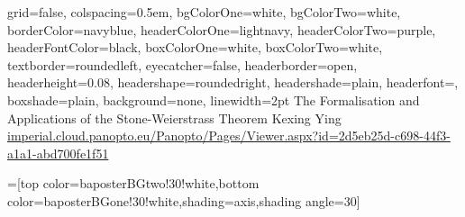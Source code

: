 \documentclass[landscape,final,a0paper]{baposter}
\begin{document}
\newlength{\leftimgwidth}
\begin{poster}%
  {
  grid=false,
  colspacing=0.5em,
  bgColorOne=white,
  bgColorTwo=white,
  borderColor=navyblue,
  headerColorOne=lightnavy,
  headerColorTwo=purple,
  headerFontColor=black,
 boxColorOne=white,
 boxColorTwo=white,
  textborder=roundedleft,
  eyecatcher=false,
  headerborder=open,
  headerheight=0.08\textheight,
  headershape=roundedright,
  headershade=plain,
  headerfont=\Large\textsf, %
  boxshade=plain,
  background=none,
  linewidth=2pt
  }
  {} %
  {\sf %
  \vspace*{5mm}
  \hspace*{2mm} The Formalisation and Applications of the Stone-Weierstrass Theorem}
  {\hspace*{4.5mm} Kexing Ying \\
   \hspace*{4.5mm} \url{imperial.cloud.panopto.eu/Panopto/Pages/Viewer.aspx?id=2d5eb25d-c698-44f3-a1a1-abd700fe1f51}
  }
  { %
  }

  =[top color=baposterBGtwo!30!white,bottom color=baposterBGone!30!white,shading=axis,shading angle=30]

     \setlength{\leftimgwidth}{0.78em+8.0em}

\newcommand{\colouredcircle}[1]{%
      \tikz{\useasboundingbox (-0.2em,-0.32em) rectangle(0.2em,0.32em); \draw[draw=black,fill=baposterBGone!80!black!#1!white,line width=0.03em] (0,0) circle(0.18em);}}


\end{poster}
\end{document}
